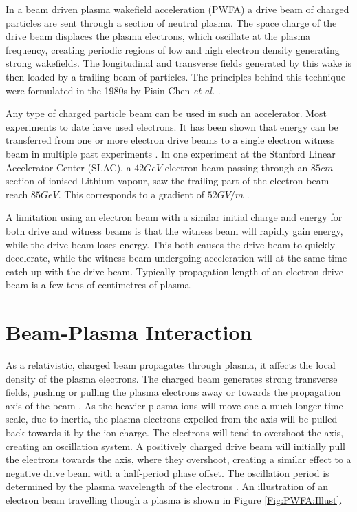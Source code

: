In a beam driven plasma wakefield acceleration (PWFA) a drive beam of charged particles are sent through a section of neutral plasma. The space charge of the drive beam displaces the plasma electrons, which oscillate at the plasma frequency, creating periodic regions of low and high electron density generating strong wakefields. The longitudinal and transverse fields generated by this wake is then loaded by a trailing beam of particles. The principles behind this technique were formulated in the 1980s by Pisin Chen \emph{et al.} \cite{chen:1985}.

Any type of charged particle beam can be used in such an accelerator. Most experiments to date have used electrons. It has been shown that energy can be transferred from one or more electron drive beams to a single electron witness beam in multiple past experiments \cite{rosenzweig:1988, blumenfeld:2007, kallos:2008, litos:2014}. In one experiment at the Stanford Linear Accelerator Center (SLAC), a $42\unit{GeV}$ electron beam passing through an $85\unit{cm}$ section of ionised Lithium vapour, saw the trailing part of the electron beam reach $85\unit{GeV}$. This corresponds to a gradient of $52\unit{GV/m}$ \cite{blumenfeld:2007}.

A limitation using an electron beam with a similar initial charge and energy for both drive and witness beams is that the witness beam will rapidly gain energy, while the drive beam loses energy. This both causes the drive beam to quickly decelerate, while the witness beam undergoing acceleration will at the same time catch up with the drive beam. Typically propagation length of an electron drive beam is a few tens of centimetres of plasma.

\section{Beam-Plasma Interaction}
\label{Int:BPI}

As a relativistic, charged beam propagates through plasma, it affects the local density of the plasma electrons. The charged beam generates strong transverse fields, pushing or pulling the plasma electrons away or towards the propagation axis of the beam \cite{lee:2001,adli:2016b}. As the heavier plasma ions will move one a much longer time scale, due to inertia, the plasma electrons expelled from the axis will be pulled back towards it by the ion charge. The electrons will tend to overshoot the axis, creating an oscillation system. A positively charged drive beam will initially pull the electrons towards the axis, where they overshoot, creating a similar effect to a negative drive beam with a half-period phase offset. The oscillation period is determined by the plasma wavelength of the electrons \cite{hogan:2016,muggli:2017}. An illustration of an electron beam travelling though a plasma is shown in Figure \ref{Fig:PWFA:Illust}.

